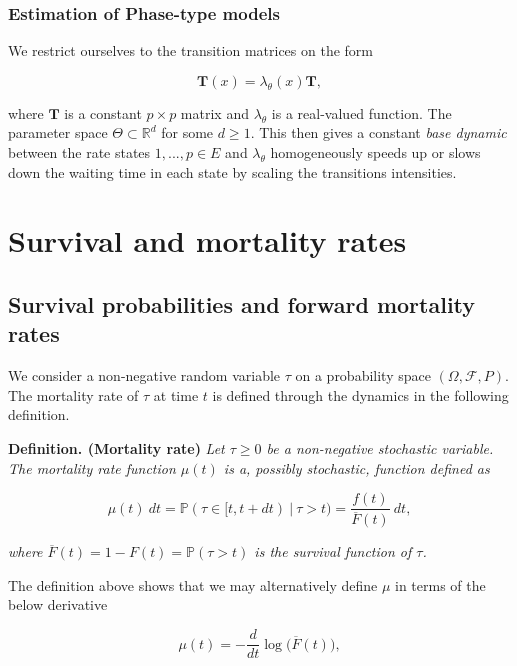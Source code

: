 \documentclass[a4paper,12pt,openany]{book}
\begin{document}
\hypertarget{estimation-of-phase-type-models}{%
\subsubsection{Estimation of Phase-type models}\label{estimation-of-phase-type-models}}

We restrict ourselves to the transition matrices on the form

\[
\mathbf T(x)=\lambda_\theta(x)\mathbf T,
\]

where \(\mathbf T\) is a constant \(p\times p\) matrix and \(\lambda_\theta\) is a real-valued function. The parameter space \(\Theta\subset \mathbb R^d\) for some \(d\ge 1\). This then gives a constant \emph{base dynamic} between the rate states \(1,...,p\in E\) and \(\lambda_\theta\) homogeneously speeds up or slows down the waiting time in each state by scaling the transitions intensities.

\hypertarget{survival-and-mortality-rates}{%
\section{Survival and mortality rates}\label{survival-and-mortality-rates}}

\hypertarget{survival-probabilities-and-forward-mortality-rates}{%
\subsection{Survival probabilities and forward mortality rates}\label{survival-probabilities-and-forward-mortality-rates}}

We consider a non-negative random variable \(\tau\) on a probability space \((\Omega,\mathcal F, P)\). The mortality rate of \(\tau\) at time \(t\) is defined through the dynamics in the following definition.

\textbf{Definition. (Mortality rate)} \emph{Let \(\tau\ge 0\) be a non-negative stochastic variable. The mortality rate function \(\mu(t)\) is a, possibly stochastic, function defined as}

\[
\mu(t)\ dt=\mathbb P(\tau\in[t,t+dt)\ \vert\ \tau > t)=\frac{f(t)}{\overline F(t)}\ dt,
\]

\emph{where \(\overline F(t)=1-F(t)=\mathbb P(\tau >t)\) is the survival function of \(\tau\).}

The definition above shows that we may alternatively define \(\mu\) in terms of the below derivative

\[
\mu(t)=-\frac{d}{dt}\log\Big(\overline F(t)\Big),
\]
\end{document}
